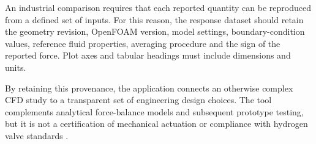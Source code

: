 An industrial comparison requires that each reported quantity can be reproduced from a defined set of inputs. For this reason, the response dataset should retain the geometry revision, OpenFOAM version, model settings, boundary-condition values, reference fluid properties, averaging procedure and the sign of the reported force. Plot axes and tabular headings must include dimensions and units.

By retaining this provenance, the application connects an otherwise complex CFD study to a transparent set of engineering design choices. The tool complements analytical force-balance models and subsequent prototype testing, but it is not a certification of mechanical actuation or compliance with hydrogen valve standards \cite{iso19880_3,moukalled2016}.
